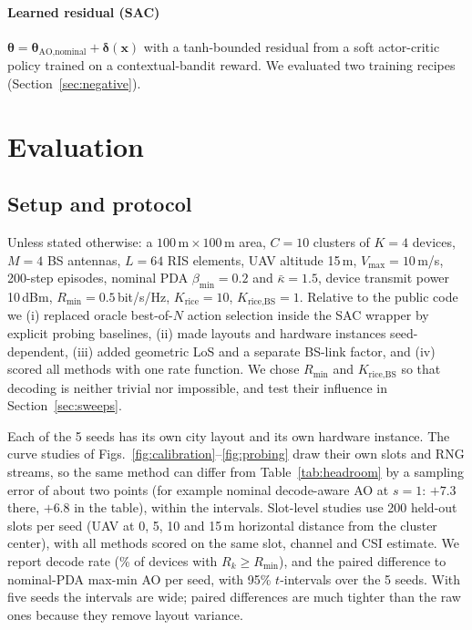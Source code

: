 \documentclass[journal]{IEEEtran}
\begin{document}
\paragraph*{Learned residual (SAC)} $\boldsymbol{\theta}=\boldsymbol{\theta}_{\text{AO,nominal}}+\boldsymbol{\delta}(\mathbf{x})$ with a tanh-bounded residual from a soft actor-critic policy trained on a contextual-bandit reward. We evaluated two training recipes (Section~\ref{sec:negative}).

\section{Evaluation}
\label{sec:eval}

\subsection{Setup and protocol}
\label{sec:setup}
Unless stated otherwise: a $100\,\text{m}\times100\,\text{m}$ area, $C=10$ clusters of $K=4$ devices, $M=4$ BS antennas, $L=64$ RIS elements, UAV altitude 15\,m, $V_{\text{max}}=10$\,m/s, 200-step episodes, nominal PDA $\beta_{\text{min}}=0.2$ and $\bar{\kappa}=1.5$, device transmit power 10\,dBm, $R_{\text{min}}=0.5$\,bit/s/Hz, $K_{\text{rice}}=10$, $K_{\text{rice,BS}}=1$. Relative to the public code we (i) replaced oracle best-of-$N$ action selection inside the SAC wrapper by explicit probing baselines, (ii) made layouts and hardware instances seed-dependent, (iii) added geometric LoS and a separate BS-link factor, and (iv) scored all methods with one rate function. We chose $R_{\text{min}}$ and $K_{\text{rice,BS}}$ so that decoding is neither trivial nor impossible, and test their influence in Section~\ref{sec:sweeps}.

Each of the 5 seeds has its own city layout and its own hardware instance. The curve studies of Figs.~\ref{fig:calibration}--\ref{fig:probing} draw their own slots and RNG streams, so the same method can differ from Table~\ref{tab:headroom} by a sampling error of about two points (for example nominal decode-aware AO at $s=1$: $+7.3$ there, $+6.8$ in the table), within the intervals. Slot-level studies use 200 held-out slots per seed (UAV at 0, 5, 10 and 15\,m horizontal distance from the cluster center), with all methods scored on the same slot, channel and CSI estimate. We report decode rate (\% of devices with $R_k\ge R_{\text{min}}$), and the paired difference to nominal-PDA max-min AO per seed, with 95\% $t$-intervals over the 5 seeds. With five seeds the intervals are wide; paired differences are much tighter than the raw ones because they remove layout variance.
\end{document}
